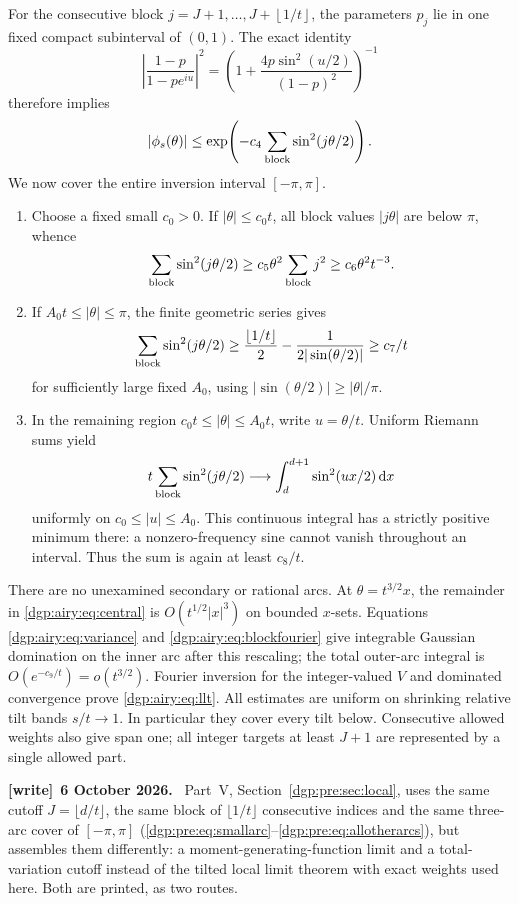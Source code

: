 \documentclass[11pt,letterpaper]{article}
\numberwithin{equation}{section}
\theoremstyle{remark}\newtheorem{remark}[theorem]{Remark}
\newcommand{\floor}[1]{\left\lfloor #1\right\rfloor}
\newcommand{\dd}{\,\mathrm d}
\newenvironment{writenote}[1][]{\par\smallskip\begingroup\small
 \noindent\textbf{[write]}\if\relax\detokenize{#1}\relax\else~\textbf{#1.}\fi\ }%
 {\par\endgroup\smallskip}
\begin{document}
For the consecutive block $j=J+1,\ldots,J+\floor{1/t}$, the parameters
$p_j$ lie in one fixed compact subinterval of $(0,1)$. The exact identity
\[
 \left|\frac{1-p}{1-pe^{iu}}\right|^2
 =\left(1+\frac{4p\sin^2(u/2)}{(1-p)^2}\right)^{-1}
\]
therefore implies
\begin{equation}\label{dgp:airy:eq:blockfourier}
 |\phi_s(\theta)|\leq
 \exp\!\left(-c_4\sum_{\rm block}\sin^2(j\theta/2)\right).
\end{equation}
We now cover the entire inversion interval $[-\pi,\pi]$.
\begin{enumerate}
\item Choose a fixed small $c_0>0$. If $|\theta|\leq c_0t$,
all block values $|j\theta|$ are below $\pi$, whence
\[
 \sum_{\rm block}\sin^2(j\theta/2)
       \geq c_5\theta^2\sum_{\rm block}j^2
       \geq c_6\theta^2t^{-3}.
\]
\item If $A_0t\leq|\theta|\leq\pi$, the finite geometric series gives
\[
 \sum_{\rm block}\sin^2(j\theta/2)
 \geq\frac{\floor{1/t}}2-\frac1{2|\sin(\theta/2)|}
 \geq c_7/t
\]
for sufficiently large fixed $A_0$, using
$|\sin(\theta/2)|\geq|\theta|/\pi$.
\item In the remaining region $c_0t\leq|\theta|\leq A_0t$, write
$u=\theta/t$. Uniform Riemann sums yield
\[
 t\sum_{\rm block}\sin^2(j\theta/2)
 \longrightarrow\int_d^{d+1}\sin^2(ux/2)\dd x
\]
uniformly on $c_0\leq|u|\leq A_0$. This continuous integral has a
strictly positive minimum there: a nonzero-frequency sine cannot
vanish throughout an interval. Thus the sum is again at least $c_8/t$.
\end{enumerate}
There are no unexamined secondary or rational arcs.
At $\theta=t^{3/2}x$, the remainder in \eqref{dgp:airy:eq:central} is
$O(t^{1/2}|x|^3)$ on bounded $x$-sets. Equations
\eqref{dgp:airy:eq:variance} and \eqref{dgp:airy:eq:blockfourier} give integrable
Gaussian domination on the inner arc after this rescaling; the total
outer-arc integral is $O(e^{-c_9/t})=o(t^{3/2})$.
Fourier inversion for the integer-valued $V$ and dominated convergence
prove \eqref{dgp:airy:eq:llt}. All estimates are uniform on shrinking relative
tilt bands $s/t\to1$. In particular they cover every tilt below.
Consecutive allowed weights also give span one; all integer targets
at least $J+1$ are represented by a single allowed part.
\begin{writenote}[6 October 2026]
Part~V, Section~\ref{dgp:pre:sec:local}, uses the same cutoff $J=\lfloor d/t\rfloor$, the same block of $\lfloor1/t\rfloor$ consecutive indices and the same three-arc cover of $[-\pi,\pi]$ (\eqref{dgp:pre:eq:smallarc}--\eqref{dgp:pre:eq:allotherarcs}), but assembles them differently: a moment-generating-function limit and a total-variation cutoff instead of the tilted local limit theorem with exact weights used here. Both are printed, as two routes.
\end{writenote}
\end{document}
